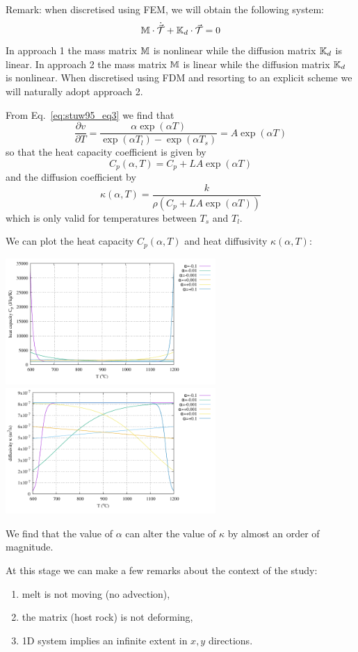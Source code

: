 Remark: when discretised using FEM, we will obtain the following system:
\[
{\mathbb{M}} \cdot \dot{\vec{{\cal T}}} + {\mathbb{K}}_d \cdot \vec{\cal T} = 0
\]
In approach 1 the mass matrix ${\mathbb{M}}$ is nonlinear while the diffusion matrix ${\mathbb{K}}_d$ is linear.
In approach 2 the mass matrix ${\mathbb{M}}$ is linear while the diffusion matrix ${\mathbb{K}}_d$ is nonlinear.
When discretised using FDM and resorting to an explicit scheme we will naturally adopt approach 2.

From Eq.~\eqref{eq:stuw95_eq3} we find that
\[
\frac{\partial v}{\partial T}  
= \frac{\alpha \exp (\alpha T) }{\exp(\alpha T_l) - \exp(\alpha T_s) } 
=A \exp (\alpha T)
\]
so that the heat capacity coefficient
is given by 
\[
C_p(\alpha,T)=C_p + L A \exp(\alpha T) 
\]
and the diffusion coefficient by
\[
\kappa(\alpha,T) = \frac{k}{\rho \left(C_p + L A \exp(\alpha T) \right)}
\]
which is only valid for temperatures between $T_s$ and $T_l$.

We can plot the heat capacity $C_p(\alpha,T)$ and heat diffusivity $\kappa(\alpha,T)$:
\begin{center}
\includegraphics[width=8cm]{python_codes/fieldstone_169/images/hcapa.pdf}
\includegraphics[width=8cm]{python_codes/fieldstone_169/images/kappa.pdf}
\end{center}
We find that the value of $\alpha$ can alter the value of $\kappa$ by almost 
an order of magnitude.

At this stage we can make a few remarks about the context of the study:
\begin{enumerate}
\item melt is not moving (no advection),
\item the matrix (host rock) is not deforming,
\item 1D system implies an infinite extent in $x,y$ directions.
\end{enumerate}


